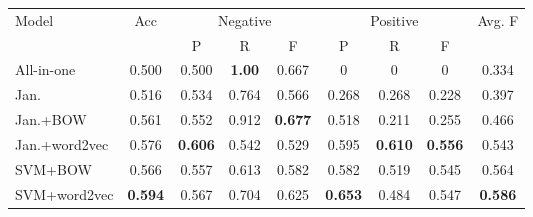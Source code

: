\documentclass[11pt]{article}
\begin{document}
\begin{table}
\begin{center}
\small
\setlength{\tabcolsep}{2pt}
\begin{tabular}{|l|c|ccc|cccc|}
\hline

\multirow{2}{*}{Model} & \multirow{2}{*}{Acc} & \multicolumn{3}{|c|}{Negative} & \multicolumn{3}{|c|}{Positive} & \multirow{2}{*}{Avg. F}\\
\cline{3-8}
& & \multicolumn{1}{|c|}{P} & \multicolumn{1}{|c|}{R} & \multicolumn{1}{|c|}{F} & \multicolumn{1}{|c|}{P} & \multicolumn{1}{|c|}{R} & \multicolumn{1}{|c|}{F} & \\
\hline
\hline
All-in-one & \multicolumn{1}{|c|}{0.500} & \multicolumn{1}{|c|}{0.500} & \multicolumn{1}{|c|}{\textbf{1.00}} & \multicolumn{1}{|c|}{0.667} & \multicolumn{1}{|c|}{0} & \multicolumn{1}{|c|}{0} & \multicolumn{1}{|c|}{0} & \multicolumn{1}{|c|}{0.334}\\
Jan.& \multicolumn{1}{|c|}{0.516} &\multicolumn{1}{|c|}{0.534} & \multicolumn{1}{|c|}{0.764} &\multicolumn{1}{|c|}{0.566} &\multicolumn{1}{|c|}{0.268}&\multicolumn{1}{|c|}{0.268}& \multicolumn{1}{|c|}{0.228} & \multicolumn{1}{|c|}{0.397}\\
Jan.+BOW&\multicolumn{1}{|c|}{0.561}  &\multicolumn{1}{|c|}{0.552} & \multicolumn{1}{|c|}{0.912}&\multicolumn{1}{|c|}{\textbf{0.677}} & \multicolumn{1}{|c|}{0.518}&\multicolumn{1}{|c|}{0.211} & \multicolumn{1}{|c|}{0.255} & \multicolumn{1}{|c|}{0.466}\\
Jan.+word2vec&\multicolumn{1}{|c|}{0.576} &\multicolumn{1}{|c|}{\textbf{0.606}} &\multicolumn{1}{|c|}{0.542} &\multicolumn{1}{|c|}{0.529} &\multicolumn{1}{|c|}{0.595}&\multicolumn{1}{|c|}{\textbf{0.610}} & \multicolumn{1}{|c|}{\textbf{0.556}} &\multicolumn{1}{|c|}{0.543} \\
SVM+BOW &\multicolumn{1}{|c|}{0.566} &\multicolumn{1}{|c|}{0.557} &\multicolumn{1}{|c|}{0.613} & \multicolumn{1}{|c|}{0.582}& \multicolumn{1}{|c|}{0.582}& \multicolumn{1}{|c|}{0.519} & \multicolumn{1}{|c|}{0.545} & \multicolumn{1}{|c|}{0.564}\\
SVM+word2vec&\multicolumn{1}{|c|}{\textbf{0.594}}  &\multicolumn{1}{|c|}{0.567} &\multicolumn{1}{|c|}{0.704} &\multicolumn{1}{|c|}{0.625}& \multicolumn{1}{|c|}{\textbf{0.653}}& \multicolumn{1}{|c|}{0.484} & \multicolumn{1}{|c|}{0.547} & \multicolumn{1}{|c|}{\textbf{0.586}}\\

\end{tabular}
\end{center}
\end{table}
\end{document}
